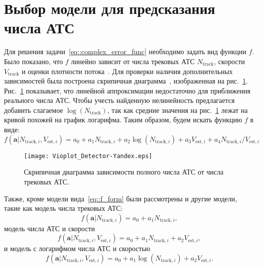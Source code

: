 \section{Выбор модели для предсказания числа АТС}
Для решения задачи~\eqref{eq::complex_error_func} необходимо задать вид функции $f$.
Было показано, что $f$ линейно зависит от числа трековых АТС $N_\text{track}$, скорости $V_\text{track}$ и оценки плотности потока~\cite{intdepvrho}.
Для проверки наличия дополнительных зависимостей была построена скрипичная диаграмма~\cite{violin}, изображенная на рис.~\ref{fig:violin}.
Рис.~\ref{fig:violin} показывает, что линейной аппроксимации недостаточно для приближения реального числа АТС.
Чтобы учесть найденную нелинейность предлагается добавить слагаемое $\log(N_\text{track})$, так как средние значения на рис.~\ref{fig:violin} лежат на кривой похожей на график логарифма.
Таким образом, будем искать функцию $f$ в виде:
\begin{equation}
    f(\mathbf{a} | N_{\text{track}, i}, V_{\text{est}, i}) = a_0 + a_1N_{\text{track}, i} + a_2\log\left({N_{\text{track}, i}}\right) + a_3V_{\text{est}, i} + a_4N_{\text{track}, i}/V_{\text{est}, i}
    \label{eq::f_form}
\end{equation}
\begin{figure}[!ht]
\begin{center}
\texttt{[image: Vioplot\_Detector-Yandex.eps]}
\caption{Скрипичная диаграмма зависимости полного числа АТС от числа трековых АТС.}
\label{fig:violin}
\end{center}
\end{figure}

Также, кроме модели вида~\eqref{eq::f_form} были рассмотрены и другие модели, такие как модель числа трековых АТС:
\begin{equation}
    f(\mathbf{a} | N_{\text{track}, i}) = a_0 + a_1N_{\text{track}, i},
    \label{eq::model_N}
\end{equation}
модель числа АТС и скорости
\begin{equation}
    f(\mathbf{a} | N_{\text{track}, i}, V_{\text{est}, i}) = a_0 + a_1N_{\text{track}, i} + a_2V_{\text{est}, i},
    \label{eq::model_NV}
\end{equation}
и модель с логарифмом числа АТС и скоростью
\begin{equation}
    f(\mathbf{a} | N_{\text{track}, i}, V_{\text{est}, i}) = a_0 + a_1\log\left({N_{\text{track}, i}}\right) + a_2V_{\text{est}, i}.
    \label{eq::model_logNV}
\end{equation}



